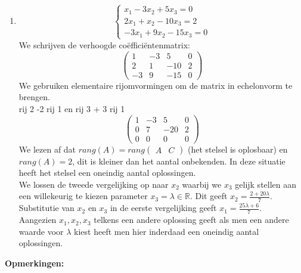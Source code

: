 \begin{enumerate}
	\item \[ \left\{ 
	\begin{array}{l}
	x_1 -3x_2 +5x_3  = 0 \\
	2x_1 + x_2 -10x_3 = 2 \\
	-3x_1 + 9x_2 -15x_3= 0 \end{array} 
	\right. \]
	We schrijven de verhoogde co\"{e}ffici\"{e}ntenmatrix:
	\[ \left(
	\begin{array}{ccc|c}
	1 & -3 & 5 & 0 \\
	2 & 1 & -10 & 2 \\
	-3 & 9 & -15 & 0 \end{array} \right) 
	\]
	We gebruiken elementaire rijomvormingen om de matrix in echelonvorm te brengen. \\
	
	rij 2 -2 rij 1 en rij 3 + 3 rij 1 
	\[ \left(
	\begin{array}{ccc|c}
	1 & -3 & 5 & 0 \\
	0 & 7 & -20 & 2 \\
	0 & 0 & 0 & 0
	\end{array} \right)
	\]
	We lezen af dat $rang(A)=rang \left( \begin{array}{c|c} A & C \end{array} \right)$ (het stelsel is oplosbaar) en $rang(A)=2$, dit is kleiner dan het aantal onbekenden. 
	In deze situatie heeft het stelsel een oneindig aantal oplossingen. \\
	We lossen de tweede vergelijking op naar $x_2$ waarbij we $x_3$ gelijk stellen aan een willekeurig te kiezen parameter $x_3 = \lambda \in \mathbb{R}$. Dit geeft $x_2 = \frac{2+20 \lambda}{7}$. Substitutie van $x_2$ en $x_3$ in de eerste vergelijking geeft $x_1 =\frac{25 \lambda + 6}{7}$. \\
	Aangezien $x_1, x_2, x_3$ telkens een andere oplossing geeft als men een andere waarde voor $\lambda$ kiest heeft men hier inderdaad een oneindig aantal oplossingen.
\end{enumerate}
 
{\bf Opmerkingen:}

